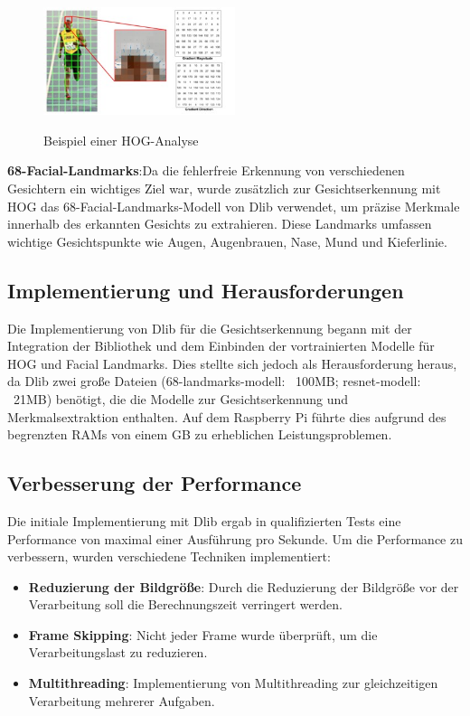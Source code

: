 \begin{figure}[h!]
    \centering
    \includegraphics[width=0.5\textwidth]{pictures/hog.jpg}
    \caption{Beispiel einer HOG-Analyse}
    \label{fig:hoganalysis}
    \cite{hoganalysis}
\end{figure}

\textbf{68-Facial-Landmarks}:Da die fehlerfreie Erkennung von verschiedenen Gesichtern ein wichtiges Ziel war, wurde  zusätzlich zur Gesichtserkennung mit HOG das 68-Facial-Landmarks-Modell von Dlib verwendet, um präzise Merkmale innerhalb des erkannten Gesichts zu extrahieren. Diese Landmarks umfassen wichtige Gesichtspunkte wie Augen, Augenbrauen, Nase, Mund und Kieferlinie.

\subsection{Implementierung und Herausforderungen}
Die Implementierung von Dlib für die Gesichtserkennung begann mit der Integration der Bibliothek und dem Einbinden der vortrainierten Modelle für HOG und Facial Landmarks. Dies stellte sich jedoch als Herausforderung heraus, da Dlib zwei große Dateien (68-landmarks-modell: ~100MB; resnet-modell: ~21MB) benötigt, die die Modelle zur Gesichtserkennung und Merkmalsextraktion enthalten. Auf dem Raspberry Pi führte dies aufgrund des begrenzten RAMs von einem GB zu erheblichen Leistungsproblemen.

\subsection{Verbesserung der Performance}
Die initiale Implementierung mit Dlib ergab in qualifizierten Tests eine Performance von maximal einer Ausführung pro Sekunde. Um die Performance zu verbessern, wurden verschiedene Techniken implementiert:

\begin{itemize}
    \item \textbf{Reduzierung der Bildgröße}: Durch die Reduzierung der Bildgröße vor der Verarbeitung soll die Berechnungszeit verringert werden.
    \item \textbf{Frame Skipping}: Nicht jeder Frame wurde überprüft, um die Verarbeitungslast zu reduzieren.
    \item \textbf{Multithreading}: Implementierung von Multithreading zur gleichzeitigen Verarbeitung mehrerer Aufgaben.
\end{itemize}


